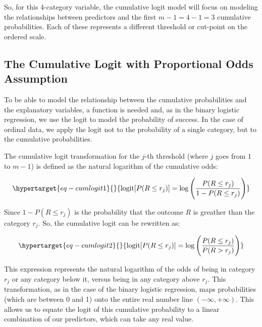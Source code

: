 \documentclass[
  letterpaper,
  DIV=11,
  numbers=noendperiod]{scrartcl}
\begin{document}
So, for this 4-category variable, the cumulative logit model will focus
on modeling the relationships between predictors and the first
\(m−1=4−1=3\) cumulative probabilities. Each of these represents a
different threshold or cut-point on the ordered scale.

\hypertarget{the-cumulative-logit-with-proportional-odds-assumption}{%
\subsection{The Cumulative Logit with Proportional Odds
Assumption}\label{the-cumulative-logit-with-proportional-odds-assumption}}

To be able to model the relationship between the cumulative
probabilities and the explanatory variables, a function is needed and,
as in the binary logistic regression, we use the logit to model the
probability of success. In the case of ordinal data, we apply the logit
not to the probability of a single category, but to the cumulative
probabilities.

The cumulative logit transformation for the \(j\)-th threshold (where
\(j\) goes from \(1\) to \(m−1\)) is defined as the natural logarithm of
the cumulative odds:

\begin{equation}\protect\hypertarget{eq-cumlogit1}{}{
\text{logit} [ P (R \leq r_j)] = \log \Bigg( \frac{P(R \leq r_j)}{1-P(R \leq r_j)}\Bigg)
}\label{eq-cumlogit1}\end{equation}

Since \(1-P(R \leq r_j)\) is the probability that the outcome \(R\) is
greather than the category \(r_j\). So, the cumulative logit can be
rewritten as:

\begin{equation}\protect\hypertarget{eq-cumlogit2}{}{
\text{logit} [ P (R \leq r_j)] = \log \Bigg( \frac{P(R \leq r_j)}{P(R > r_j)}\Bigg)
}\label{eq-cumlogit2}\end{equation}

This expression represents the natural logarithm of the odds of being in
category \(r_j\) or any category below it, versus being in any category
above \(r_j\). This transformation, as in the case of the binary
logistic regression, maps probabilities (which are between 0 and 1) onto
the entire real number line \((-\infty, + \infty)\). This allows us to
equate the logit of this cumulative probability to a linear combination
of our predictors, which can take any real value.
\end{document}
